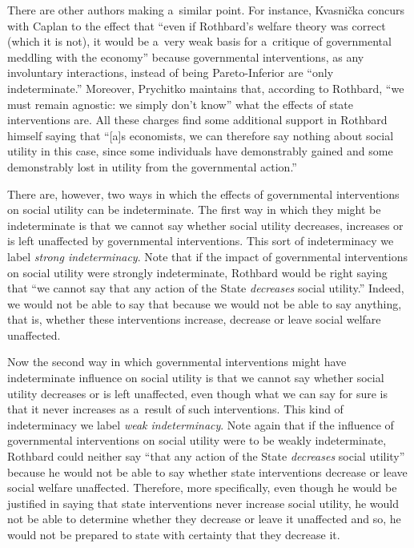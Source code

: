There are other authors making a~similar point. For instance, Kvasnička 
\parencite*[][p.49]{kvasnicka_rothbards_2008} %
 concurs with Caplan to the effect that ``even if Rothbard's welfare theory was correct (which it is not), it would be a~very weak basis for a~critique of governmental meddling with the economy'' because governmental interventions, as any involuntary interactions, instead of being Pareto-Inferior are ``only indeterminate.'' Moreover, Prychitko 
\parencite*[][p.576]{prychitko_formalism_1993} %
 maintains that, according to Rothbard, ``we must remain agnostic: we simply don't know'' what the effects of state interventions are. All these charges find some additional support in Rothbard 
\parencite*[][p.252]{rothbard_toward_2008} %
 himself saying that ``[a]s economists, we can therefore say nothing about social utility in this case, since some individuals have demonstrably gained and some demonstrably lost in utility from the governmental action.''



There are, however, two ways in which the effects of governmental interventions on social utility can be indeterminate. The first way in which they might be indeterminate is that we cannot say whether social utility decreases, increases or is left unaffected by governmental interventions. This sort of indeterminacy we label \textit{strong indeterminacy}. Note that if the impact of governmental interventions on social utility were strongly indeterminate, Rothbard would be right saying that ``we cannot say that any action of the State \textit{decreases} social utility.'' Indeed, we would not be able to say that because we would not be able to say anything, that is, whether these interventions increase, decrease or leave social welfare unaffected.



Now the second way in which governmental interventions might have indeterminate influence on social utility is that we cannot say whether social utility decreases or is left unaffected, even though what we can say for sure is that it never increases as a~result of such interventions. This kind of indeterminacy we label \textit{weak indeterminacy}. Note again that if the influence of governmental interventions on social utility were to be weakly indeterminate, Rothbard could neither say ``that any action of the State \textit{decreases} social utility'' because he would not be able to say whether state interventions decrease or leave social welfare unaffected. Therefore, more specifically, even though he would be justified in saying that state interventions never increase social utility, he would not be able to determine whether they decrease or leave it unaffected and so, he would not be prepared to state with certainty that they decrease it.



